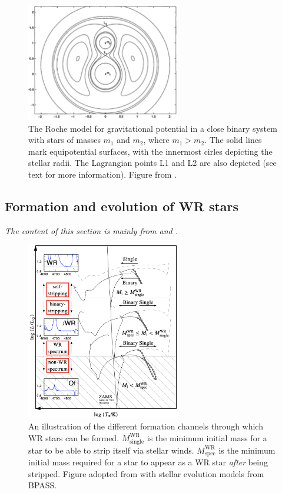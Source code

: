 \begin{figure}
\centering
\includegraphics[width=0.6\textwidth]{chapters/introduction/image/RocheLobe.pdf}
\caption{The Roche model for gravitational potential in a close binary system with stars of masses $m_1$ and $m_2$, where $m_1>m_2$. The solid lines mark equipotential surfaces, with the innermost cirles depicting the stellar radii. The Lagrangian points L1 and L2 are also depicted (see text for more information). Figure from \citet{2001hilditch_close_binaries}.}
\label{fig:roche_lobes}
\end{figure}

\subsection{Formation and evolution of WR stars}

\textit{The content of this section is mainly from \citet{crowther_physical_2007} and \citet{shenar_why_2020}.}

\begin{figure}
    \centering
    \includegraphics[width=0.6\textwidth]{chapters/introduction/image/FormationChannels.png}
    \caption{An illustration of the different formation channels through which WR stars can be formed. $M^{\textrm{WR}}_{\textrm{single}}$ is the minimum initial mass for a star to be able to strip itself via stellar winds. $M^{\textrm{WR}}_{\textrm{spec}}$ is the minimum initial mass required for a star to appear as a WR star \textit{after} being stripped. Figure adopted from \citet{shenar_why_2020} with stellar evolution models from BPASS.}
    \label{fig:formation_wr}
\end{figure}

